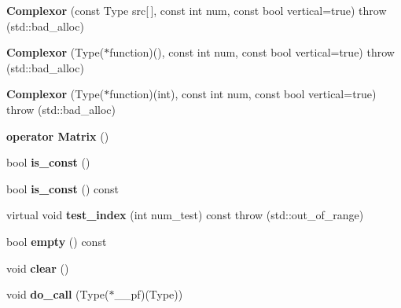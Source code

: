 \begin{DoxyCompactItemize}
{\bfseries Complexor} (const Type src\mbox{[}$\,$\mbox{]}, const int num, const bool vertical=true)  throw (std\+::bad\+\_\+alloc)
\item 
\mbox{\label{classkerbal_1_1math_1_1_complexor_ac75c84cf468f9a358d837b4507519b4e}} 
{\bfseries Complexor} (Type($\ast$function)(), const int num, const bool vertical=true)  throw (std\+::bad\+\_\+alloc)
\item 
\mbox{\label{classkerbal_1_1math_1_1_complexor_aa5d4bd980b0ae9136d2ed15d35b56b73}} 
{\bfseries Complexor} (Type($\ast$function)(int), const int num, const bool vertical=true)  throw (std\+::bad\+\_\+alloc)
\item 
\mbox{\label{classkerbal_1_1math_1_1_complexor_a85e97b4e514bdd0a5edfc00fd12898b2}} 
{\bfseries operator Matrix} ()
\item 
\mbox{\label{classkerbal_1_1math_1_1_complexor_af0761c147d06ae5761258a750b0d6534}} 
bool {\bfseries is\+\_\+const} ()
\item 
\mbox{\label{classkerbal_1_1math_1_1_complexor_a0ead2d9c54e88c1c1840d6080ba5a172}} 
bool {\bfseries is\+\_\+const} () const
\item 
\mbox{\label{classkerbal_1_1math_1_1_complexor_ab23e32cb9d722d353c925eeec6ac53b5}} 
virtual void {\bfseries test\+\_\+index} (int num\+\_\+test) const  throw (std\+::out\+\_\+of\+\_\+range)
\item 
\mbox{\label{classkerbal_1_1math_1_1_complexor_a023365b9066f281febe424fd5248dc16}} 
bool {\bfseries empty} () const
\item 
\mbox{\label{classkerbal_1_1math_1_1_complexor_a6e748a8b39fcdaced370b0af1ec28fad}} 
void {\bfseries clear} ()
\item 
\mbox{\label{classkerbal_1_1math_1_1_complexor_a64b14658a313de904cc4146d08e5d6d3}} 
void {\bfseries do\+\_\+call} (Type($\ast$\+\_\+\+\_\+pf)(Type))

\end{DoxyCompactItemize}
